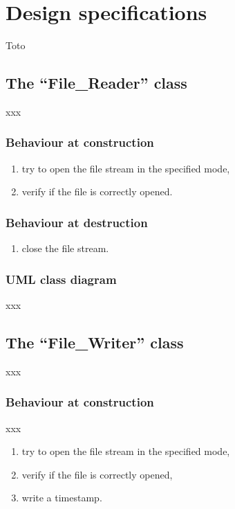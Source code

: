 \chapter{Design specifications}

Toto


\section{The \enquote{File\_Reader} class}

	xxx
	
	
	\subsection{Behaviour at construction}
		
		\begin{enumerate}
			\item try to open the file stream in the specified mode,
			\item verify if the file is correctly opened.
		\end{enumerate}
	
	
	\subsection{Behaviour at destruction}
		
		\begin{enumerate}
			\item close the file stream.
		\end{enumerate}
	
	
	\subsection{UML class diagram}
	
		xxx
	
	
\section{The \enquote{File\_Writer} class}

	xxx
	
	
	\subsection{Behaviour at construction}
	
		xxx
	
		\begin{enumerate}
			\item try to open the file stream in the specified mode,
			\item verify if the file is correctly opened,
			\item write a timestamp.
		\end{enumerate}
	
